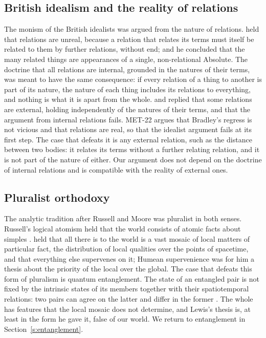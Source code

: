 \documentclass{situationist-preprint}
\begin{document}
\subsection{British idealism and the reality of relations}

The monism of the British idealists was argued from the nature of relations. \citet{Bradley1893} held that relations are unreal, because a relation that relates its terms must itself be related to them by further relations, without end; and he concluded that the many related things are appearances of a single, non-relational Absolute. The doctrine that all relations are internal, grounded in the natures of their terms, was meant to have the same consequence: if every relation of a thing to another is part of its nature, the nature of each thing includes its relations to everything, and nothing is what it is apart from the whole. \citet{Russell1903} and \citet{Moore1919} replied that some relations are external, holding independently of the natures of their terms, and that the argument from internal relations fails. MET-22 argues that Bradley's regress is not vicious and that relations are real, so that the idealist argument fails at its first step. The case that defeats it is any external relation, such as the distance between two bodies: it relates its terms without a further relating relation, and it is not part of the nature of either. Our argument does not depend on the doctrine of internal relations and is compatible with the reality of external ones.

\subsection{Pluralist orthodoxy}

The analytic tradition after Russell and Moore was pluralist in both senses. Russell's logical atomism held that the world consists of atomic facts about simples \citep{Russell1918}. \citet{Lewis1986Papers} held that all there is to the world is a vast mosaic of local matters of particular fact, the distribution of local qualities over the points of spacetime, and that everything else supervenes on it; Humean supervenience was for him a thesis about the priority of the local over the global. The case that defeats this form of pluralism is quantum entanglement. The state of an entangled pair is not fixed by the intrinsic states of its members together with their spatiotemporal relations: two pairs can agree on the latter and differ in the former \citep{Teller1986,Healey1991,Maudlin2007}. The whole has features that the local mosaic does not determine, and Lewis's thesis is, at least in the form he gave it, false of our world. We return to entanglement in Section~\ref{s:entanglement}.
\end{document}
